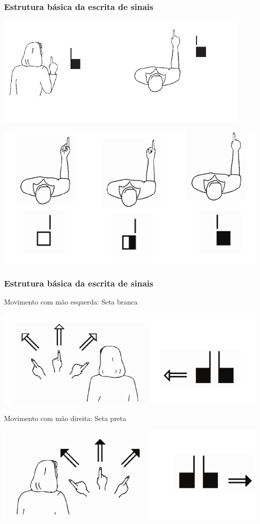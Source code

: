 \documentclass[10pt]{beamer}
\theoremstyle{plain}
\theoremstyle{definition}
\begin{document}
	
	\begin{frame}
		\frametitle{Estrutura básica da escrita de sinais}
		\begin{center}
			\includegraphics[scale=0.54]{figures/basico4.png}
			
			\includegraphics[scale=0.54]{figures/basico4-1.png}
		\end{center}
	\end{frame}

	
	\begin{frame}
		\frametitle{Estrutura básica da escrita de sinais}
		\begin{center}
			Movimento com mão esquerda: Seta branca
			
			\includegraphics[scale=0.54]{figures/basico5.png}
			\vspace{0.5cm}
			
			
			Movimento com mão direita: Seta preta
			
			\includegraphics[scale=0.54]{figures/basico5-1.png}
		\end{center}
	\end{frame}
	
\end{document}
